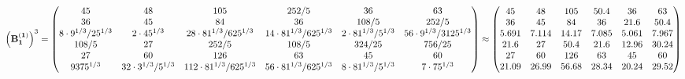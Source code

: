 \documentclass[10pt,a4paper]{article}
\begin{document}
	\[
		\left(\bold{B_1^{(1)}}\right)^{3} = 
		\begin{pmatrix}
			{{45}}{} & {{48}}{} & {{105}}{} & {{252}} / {{5}} & {{36}}{} & {{63}}{} \\
			{{36}}{} & {{45}}{} & {{84}}{} & {{36}}{} & {{108}} / {{5}} & {{252}} / {{5}} \\
			{{8} \cdot {9^ {1 / 3}}} / {{25^ {1 / 3}}} & {{2} \cdot {45^ {1 / 3}}}{} & {{28} \cdot {81^ {1 / 3}}} / {{625^ {1 / 3}}} & {{14} \cdot {81^ {1 / 3}}} / {{625^ {1 / 3}}} & {{2} \cdot {81^ {1 / 3}}} / {{5^ {1 / 3}}} & {{56} \cdot {9^ {1 / 3}}} / {{3125^ {1 / 3}}} \\
			{{108}} / {{5}} & {{27}}{} & {{252}} / {{5}} & {{108}} / {{5}} & {{324}} / {{25}} & {{756}} / {{25}} \\
			{{27}}{} & {{60}}{} & {{126}}{} & {{63}}{} & {{45}}{} & {{60}}{} \\
			{{9375^ {1 / 3}}}{} & {{32} \cdot {3^ {1 / 3}}} / {{5^ {1 / 3}}} & {{112} \cdot {81^ {1 / 3}}} / {{625^ {1 / 3}}} & {{56} \cdot {81^ {1 / 3}}} / {{625^ {1 / 3}}} & {{8} \cdot {81^ {1 / 3}}} / {{5^ {1 / 3}}} & {{7} \cdot {75^ {1 / 3}}}{} \\
		\end{pmatrix}
		\approx
		\begin{pmatrix}
			45       & 48       & 105      & 50.4     & 36       & 63       \\
			36       & 45       & 84       & 36       & 21.6     & 50.4     \\
			5.691    & 7.114    & 14.17    & 7.085    & 5.061    & 7.967    \\
			21.6     & 27       & 50.4     & 21.6     & 12.96    & 30.24    \\
			27       & 60       & 126      & 63       & 45       & 60       \\
			21.09    & 26.99    & 56.68    & 28.34    & 20.24    & 29.52    \\
		\end{pmatrix}
	\]
\end{document}
